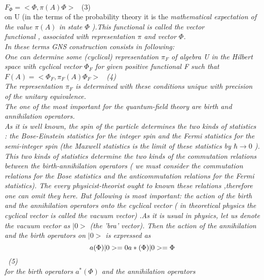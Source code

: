 \documentclass[a4paper,12pt] {article}
\begin{document}
\\$ F_\Phi =< \Phi ,\pi (A)  \Phi >$ \rm \ (3) \\ on U (in the terms of the  probability theory it is the
 \it mathematical expectation \rm  of the value $\pi (A)$   \it in  state  $\Phi$ \rm ).This functional is called
  \it the vector\\ functional , associated with  representation  $\pi $ \it  and   vector  $\Phi$.
\\ \rm  In these terms  GNS construction consists in following:\\\it One can determine some (cyclical)
 representation  $\pi_F$  \it of algebra \rm U \it in the Hilbert space with cyclical   vector  $\Phi_F$ \it  for
 given positive functional \rm F  \it such that
  \\$ F(A)= <\Phi_F, \pi_F (A) \Phi_F >$ \rm \  (4)\\ \it The representation   $\pi_F$ \it is determined with
 these conditions unique with precision of the unitary equivalence.
\\ \rm The one of the most important for the quantum-field theory are  \it  birth and annihilation
operators.
\\ \rm  As it is well known, the spin of the particle determines the  two kinds of statistics : \it  the
 Bose-Einstein statistics for the integer spin and the Fermi statistics for the semi-integer spin \rm (the
  Maxwell statistics is the limit of these  statistics by $\hbar \to 0 $ ). This two kinds of statistics
 determine the  two kinds of the commutation relations  between the birth-annihilation operators
( we must consider  the commutation relations  for the  Bose  statistics and the anticommutation relations
 for the  Fermi  statistics). The every physicist-theorist ought to known these relations ,therefore one can
 omit they here. But following is most important: the action of the birth and  the annihilation  operators
onto  the cyclical vector ( in theoretical physics the cyclical vector is called  \it the vacuum vector\rm) .As it is usual in physics, let us denote the  vacuum vector as $\vert 0 >$  (\it the  'bra' vector\rm). Then
the  action of the  annihilation and the birth operators on $\vert 0 >$ is expressed as
\\ \begin{equation} a ( \Phi ) \vert 0 > =0\\  a*(
 \Phi ) \vert 0 > =\Phi  
\end{equation} \   (5) \\ for the birth operators  $ a^*(\Phi ) $ and the  annihilation operators
\end{document}
